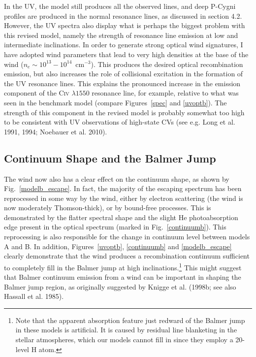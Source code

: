 In the UV, the model still produces all the observed lines, 
and deep P-Cygni profiles are produced in the normal resonance lines,
as discussed in section 4.2. However, the UV spectra also
display what is perhaps the biggest problem with this revised model,
namely the strength of resonance line emission 
at low and intermediate inclinations.
In order to generate strong optical wind signatures, I have adopted wind
parameters that lead to very high densities at the base of the wind
($n_e\sim10^{13}-10^{14}$~cm$^{-3}$). This produces
the desired optical recombination emission, but also increases the
role of collisional excitation in the formation of the UV resonance
lines. This explains the pronounced increase in the emission component 
of the C\textsc{iv} $\lambda1550$ resonance line, for example, relative to
what was seen in the benchmark model (compare Figures~\ref{spec} and
\ref{uvoptb}). The strength of this component in the revised model 
is probably somewhat too high to be consistent with UV observations 
of high-state CVs (see e.g. Long et al. 1991, 1994; Noebauer et al. 2010).
\nocite{long1991,long1994, noebauer}


\subsection{Continuum Shape and the Balmer Jump}

The wind now also has a clear effect on the continuum shape,
as shown by Fig.~\ref{modelb_escape}. In fact, the majority of the
escaping spectrum has been reprocessed in some way by the wind,
either by electron scattering (the wind is now moderately Thomson-thick),
or by bound-free processes. This is demonstrated by the flatter spectral shape
and the slight He photoabsorption edge present in the optical spectrum 
(marked in Fig.~\ref{continuumb}). This reprocessing is also
responsible for the change in continuum level between models A and B.
In addition, Figures~\ref{uvoptb}, \ref{continuumb} 
and \ref{modelb_escape} clearly demonstrate that the wind produces
a recombination continuum sufficient to completely fill in the Balmer jump
at high inclinations.\footnote{Note that the apparent absorption feature 
just redward of the Balmer jump in these models is artificial. It is
caused by residual line blanketing in the stellar atmospheres, which
our models cannot fill in since they employ a 20-level H atom.}
This might suggest that Balmer continuum emission from a wind can be important 
in shaping the Balmer jump region, as
originally suggested by Knigge et al.
(1998b; see also Hassall et al. 1985)\nocite{KLWB98,hassall}. 

